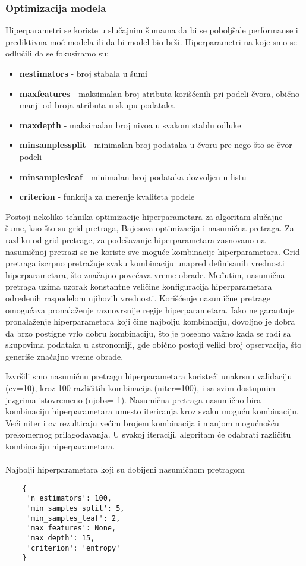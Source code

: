 \documentclass[a4paper,12pt]{article}
\begin{document}
\subsubsection{Optimizacija modela}
Hiperparametri se koriste u slučajnim šumama da bi se poboljšale performanse i prediktivna moć modela ili da bi model bio brži.
Hiperparametri na koje smo se odlučili da se fokusiramo su:
\begin{itemize}
    \item \textbf{n\textunderscore estimators} - broj stabala u šumi
    \item \textbf{max\textunderscore features} - maksimalan broj atributa korišćenih pri podeli čvora, obično manji od broja atributa u skupu podataka
    \item \textbf{max\textunderscore depth} - maksimalan broj nivoa u svakom stablu odluke
    \item \textbf{min\textunderscore samples\textunderscore split} - minimalan broj podataka u čvoru pre nego što se čvor podeli
    \item \textbf{min\textunderscore samples\textunderscore leaf} - minimalan broj podataka dozvoljen u listu
    \item \textbf{criterion} - funkcija za merenje kvaliteta podele
\end{itemize}

Postoji nekoliko tehnika optimizacije hiperparametara za algoritam slučajne šume, kao što su grid pretraga, Bajesova optimizacija i nasumična pretraga. Za razliku od grid pretrage, za podešavanje hiperparametara zasnovano na nasumičnoj pretrazi se ne koriste sve moguće kombinacije hiperparametara. Grid pretraga iscrpno pretražuje svaku kombinaciju unapred definisanih vrednosti hiperparametara, što značajno povećava vreme obrade. Međutim, nasumična pretraga uzima uzorak konstantne veličine konfiguracija hiperparametara određenih raspodelom njihovih vrednosti. Korišćenje nasumične pretrage omogućava pronalaženje raznovrsnije regije hiperparametara. Iako ne garantuje pronalaženje hiperparametara koji čine najbolju kombinaciju, dovoljno je dobra da brzo postigne vrlo dobru kombinaciju, što je posebno važno kada se radi sa skupovima podataka u astronomiji, gde obično postoji veliki broj opservacija, što generiše značajno vreme obrade.

Izvršili smo nasumičnu pretragu hiperparametara koristeći unakrsnu validaciju (cv=10), kroz 100 različitih kombinacija (n\textunderscore iter=100), i sa svim dostupnim jezgrima istovremeno (n\textunderscore jobs=-1). Nasumična pretraga nasumično bira kombinaciju hiperparametara umesto iteriranja kroz svaku moguću kombinaciju. Veći n\textunderscore iter i cv rezultiraju većim brojem kombinacija i manjom mogućnošću prekomernog prilagođavanja. U svakoj iteraciji, algoritam će odabrati različitu kombinaciju hiperparametara.\\\\
Najbolji hiperparametara koji su dobijeni nasumičnom pretragom
\begin{verbatim}
    {
     'n_estimators': 100,
     'min_samples_split': 5,
     'min_samples_leaf': 2,
     'max_features': None,
     'max_depth': 15,
     'criterion': 'entropy'
    }
\end{verbatim}
\end{document}
